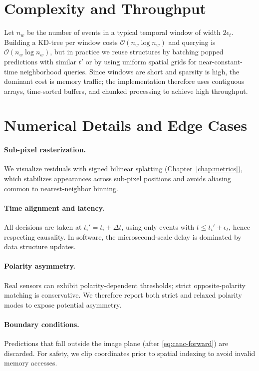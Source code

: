 \section{Complexity and Throughput}
Let $n_w$ be the number of events in a typical temporal window of width $2\epsilon_t$. Building a KD-tree per window costs $\mathcal{O}(n_w\log n_w)$ and querying is $\mathcal{O}(n_w\log n_w)$, but in practice we reuse structures by batching popped predictions with similar $t'$ or by using uniform spatial grids for near-constant-time neighborhood queries. Since windows are short and sparsity is high, the dominant cost is memory traffic; the implementation therefore uses contiguous arrays, time-sorted buffers, and chunked processing to achieve high throughput.

\section{Numerical Details and Edge Cases}
\paragraph{Sub-pixel rasterization.}
We visualize residuals with signed bilinear splatting (Chapter~\ref{chap:metrics}), which stabilizes appearances across sub-pixel positions and avoids aliasing common to nearest-neighbor binning.

\paragraph{Time alignment and latency.}
All decisions are taken at $t_i' = t_i+\Delta t$, using only events with $t\le t_i'+\epsilon_t$, hence respecting causality. In software, the microsecond-scale delay is dominated by data structure updates.

\paragraph{Polarity asymmetry.}
Real sensors can exhibit polarity-dependent thresholds; strict opposite-polarity matching is conservative. We therefore report both strict and relaxed polarity modes to expose potential asymmetry.

\paragraph{Boundary conditions.}
Predictions that fall outside the image plane (after \eqref{eq:canc-forward}) are discarded. For safety, we clip coordinates prior to spatial indexing to avoid invalid memory accesses.

